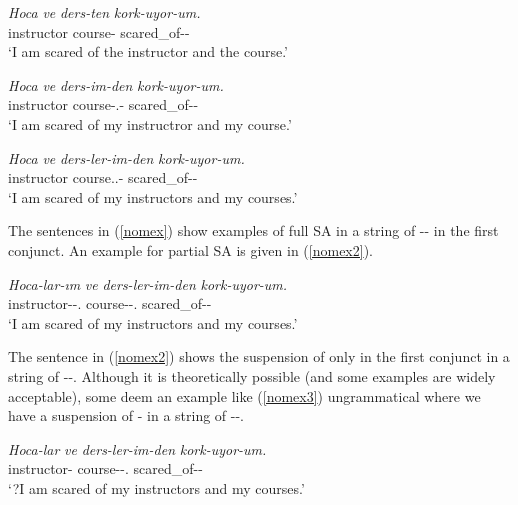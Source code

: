 \begin{exe}
    \ex \label{nomex} 
    \begin{xlist}
        \ex 
        \gll 
        \textit{Hoca} \textit{ve} \textit{ders-ten} \textit{kork-uyor-um.} \\ instructor {\And} course-{\Abl} scared\_of-{\Prog}-{\First}{\Sg} \\
        \glt `I am scared of the instructor and the course.'
        
        \ex
        \gll 
        \textit{Hoca} \textit{ve} \textit{ders-im-den} \textit{kork-uyor-um.} \\ instructor {\And} course-{\First}{\Sg}.{\Poss}-{\Abl} scared\_of-{\Prog}-{\First}{\Sg} \\
        \glt `I am scared of my instructror and my course.' 
        
        \ex 
        \gll 
        \textit{Hoca} \textit{ve} \textit{ders-ler-im-den} \textit{kork-uyor-um.} \\ instructor {\And} course.{\First}{\Sg}.{\Poss}-{\Abl} scared\_of-{\Prog}-{\First}{\Sg} \\
        \glt `I am scared of my instructors and my courses.'
    \end{xlist}
\end{exe}
The sentences in (\ref{nomex}) show examples of full SA in a string of {\Pl}-{\Poss}-{\Case} in the first conjunct. An example for partial SA is given in (\ref{nomex2}).

\begin{exe}
    \ex \label{nomex2}
    \gll
    \textit{Hoca-lar-ım} \textit{ve} \textit{ders-ler-im-den} \textit{kork-uyor-um.} \\ instructor-{\Pl}-{\First}{\Sg}.{\Poss} {\And} course-{\Pl}-{\First}{\Sg}.{\Poss} scared\_of-{\Prog}-{\First}{\Sg} \\
    \glt `I am scared of my instructors and my courses.'
\end{exe}
The sentence in (\ref{nomex2}) shows the suspension of only {\Case} in the first conjunct in a string of {\Pl}-{\Poss}-{\Case}. Although it is theoretically possible (and some examples are widely acceptable), some deem an example like (\ref{nomex3}) ungrammatical where we have a suspension of {\Poss}-{\Case} in a string of {\Pl}-{\Poss}-{\Case}.

\begin{exe}
    \ex \label{nomex3}
    \gll 
    \textit{Hoca-lar} \textit{ve} \textit{ders-ler-im-den} \textit{kork-uyor-um.} \\ instructor-{\Pl} {\And} course-{\Pl}-{\First}{\Sg}.{\Poss} scared\_of-{\Prog}-{\First}{\Sg} \\
    \glt `?I am scared of my instructors and my courses.'
\end{exe}

